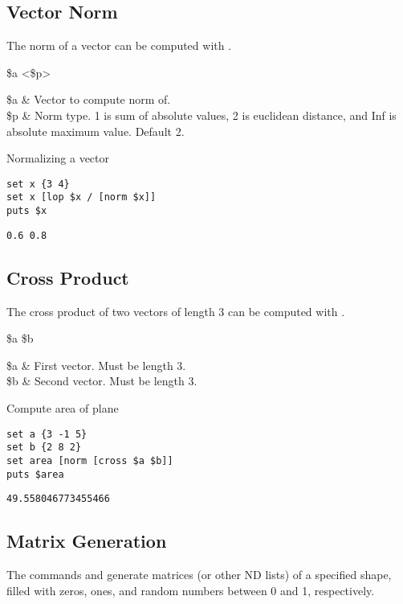 \documentclass{article}
\begin{document}
\subsection{Vector Norm}
The norm of a vector can be computed with .
\begin{syntax}
 \$a <\$p>
\end{syntax}
\begin{args}
\$a & Vector to compute norm of. \\
\$p & Norm type. 1 is sum of absolute values, 2 is euclidean distance, and Inf is absolute maximum value. Default 2.
\end{args}

\begin{example}{Normalizing a vector}
\begin{lstlisting}
set x {3 4}
set x [lop $x / [norm $x]]
puts $x
\end{lstlisting}
\tcblower
\begin{lstlisting}
0.6 0.8
\end{lstlisting}
\end{example}

\subsection{Cross Product}
The cross product of two vectors of length 3 can be computed with . 
\begin{syntax}
 \$a \$b
\end{syntax}
\begin{args}
\$a & First vector. Must be length 3.\\
\$b & Second vector. Must be length 3.
\end{args}

\begin{example}{Compute area of plane}
\begin{lstlisting}
set a {3 -1 5}
set b {2 8 2}
set area [norm [cross $a $b]]
puts $area
\end{lstlisting}
\tcblower
\begin{lstlisting}
49.558046773455466
\end{lstlisting}
\end{example}
\clearpage
\subsection{Matrix Generation}
The commands   and  generate matrices (or other ND lists) of a specified shape, filled with zeros, ones, and random numbers between 0 and 1, respectively.
\end{document}
